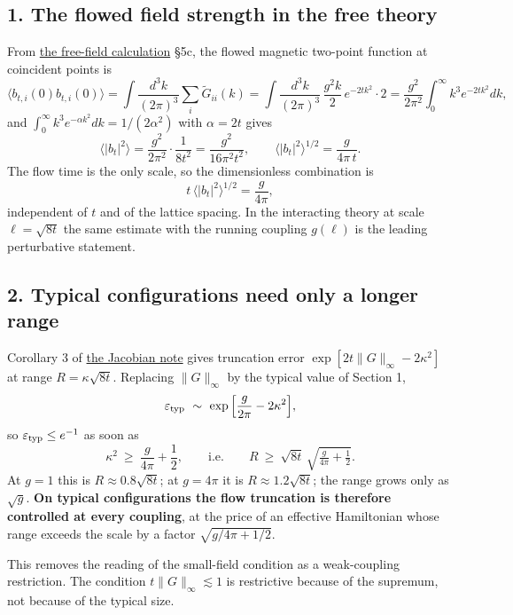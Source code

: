 \documentclass[11pt,a4paper]{article}
\begin{document}
\hypertarget{the-flowed-field-strength-in-the-free-theory}{%
\subsection{1. The flowed field strength in the free
theory}\label{the-flowed-field-strength-in-the-free-theory}}

From \href{finiteness-half-flowed-susceptibility.md}{the free-field
calculation} §5c, the flowed magnetic two-point function at coincident
points is \[\big\langle b_{t,i}(0)b_{t,i}(0)\big\rangle
=\int\!\frac{d^3k}{(2\pi)^3}\sum_i\tilde G_{ii}(k)
=\int\!\frac{d^3k}{(2\pi)^3}\,\frac{g^2k}{2}\,e^{-2tk^2}\cdot2
=\frac{g^2}{2\pi^2}\int_0^\infty\!k^3e^{-2tk^2}dk,\] and
\(\int_0^\infty k^3e^{-\alpha k^2}dk=1/(2\alpha^2)\) with \(\alpha=2t\)
gives
\[\big\langle|b_t|^2\big\rangle=\frac{g^2}{2\pi^2}\cdot\frac1{8t^2}=\frac{g^2}{16\pi^2t^2},
\qquad \big\langle|b_t|^2\big\rangle^{1/2}=\frac{g}{4\pi\,t}.\] The flow
time is the only scale, so the dimensionless combination is
\[t\,\big\langle|b_t|^2\big\rangle^{1/2}=\frac{g}{4\pi},\] independent
of \(t\) and of the lattice spacing. In the interacting theory at scale
\(\ell=\sqrt{8t}\) the same estimate with the running coupling
\(g(\ell)\) is the leading perturbative statement.

\hypertarget{typical-configurations-need-only-a-longer-range}{%
\subsection{2. Typical configurations need only a longer
range}\label{typical-configurations-need-only-a-longer-range}}

Corollary 3 of \href{flow-jacobian-truncation-error.md}{the Jacobian
note} gives truncation error \(\exp[2t\|G\|_\infty-2\kappa^2]\) at range
\(R=\kappa\sqrt{8t}\). Replacing \(\|G\|_\infty\) by the typical value
of Section 1,
\[\varepsilon_{\rm typ}\ \sim\ \exp\Big[\frac{g}{2\pi}-2\kappa^2\Big],\]
so \(\varepsilon_{\rm typ}\le e^{-1}\) as soon as
\[\kappa^2\ \ge\ \frac{g}{4\pi}+\frac12,
\qquad\text{i.e.}\qquad R\ \ge\ \sqrt{8t}\,\sqrt{\tfrac{g}{4\pi}+\tfrac12}.\]
At \(g=1\) this is \(R\approx0.8\sqrt{8t}\); at \(g=4\pi\) it is
\(R\approx1.2\sqrt{8t}\); the range grows only as \(\sqrt g\).
\textbf{On typical configurations the flow truncation is therefore
controlled at every coupling}, at the price of an effective Hamiltonian
whose range exceeds the scale by a factor \(\sqrt{g/4\pi+1/2}\).

This removes the reading of the small-field condition as a weak-coupling
restriction. The condition \(t\|G\|_\infty\lesssim1\) is restrictive
because of the supremum, not because of the typical size.
\end{document}

